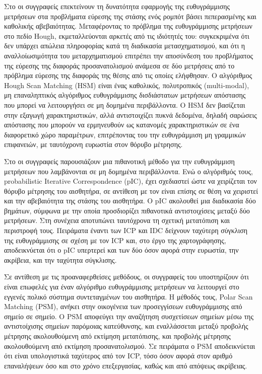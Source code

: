 Στο \cite{Censia} οι συγγραφείς επεκτείνουν τη δυνατότητα εφαρμογής της
ευθυγράμμισης μετρήσεων στα προβλήματα εύρεσης της στάσης ενός ρομπότ βάσει
πεπερασμένης και καθολικής αβεβαιότητας. Μεταφέροντας το πρόβλημα της
ευθυγράμμισης μετρήσεων στο πεδίο Hough, εκμεταλλεύονται αρκετές από τις
ιδιότητές του: συγκεκριμένα ότι δεν υπάρχει απώλεια πληροφορίας κατά τη
διαδικασία μετασχηματισμού, και ότι η αναλλοίωσιμότητα του μεταρχηματισμού
επιτρέπει την αποσύνδεση του προβλήματος της εύρεσης της διαφοράς
προσανατολισμού ανάμεσα σε δύο μετρήσεις από το πρόβλημα εύρεσης της διαφοράς
της θέσης από τις οποίες ελήφθησαν. Ο αλγόριθμος Hough Scan Matching (HSM)
είναι ένας καθολικός, πολυτροπικός (multi-modal), μη επαναληπτικός αλγόριθμος
ευθυγράμμισης δισδιάστατων μετρήσεων απόστασης που μπορεί να λειτουργήσει σε μη
δομημένα περιβάλλοντα. Ο HSM δεν βασίζεται στην εξαγωγή χαρακτηριστικών, αλλά
αντιστοιχίζει πυκνά δεδομένα, δηλαδή σαρώσεις απόστασης που μπορούν να
ερμηνευθούν ως κατανομές χαρακτηριστικών σε ένα διαφορετικό χώρο παραμέτρων,
επιτρέποντας του την ευθυγράμμιση μη γραμμικών επιφανειών, με ταυτόχρονη
ευρωστία στον θόρυβο μέτρησης.

Στο \cite{Montesano2005} οι συγγραφείς παρουσιάζουν μια πιθανοτική μέθοδο για
την ευθυγράμμιση μετρήσεων που λαμβάνονται σε μη δομημένα περιβάλλοντα. Ενώ ο
αλγόριθμός τους, probabilistic Iterative Correspondence (pIC), έχει σχεδιαστεί
ώστε να χειρίζεται τον θόρυβο μέτρησης του αισθητήρα, σε αντίθεση με τον
\cite{Pfistera} είναι επίσης σε θέση να χειριστεί και την αβεβαιότητα της
στάσης του αισθητήρα. O pIC ακολουθεί μια διαδικασία δύο βημάτων, σύμφωνα με
την οποία προσδιορίζει πιθανοτικά αντιστοιχίσεις μεταξύ δύο μετρήσεων. Στη
συνέχεια αποτυπώνει ταυτόχρονα τη σχετική μετατόπιση και περιστροφή τους.
Πειράματα έναντι των ICP και IDC δείχνουν ταχύτερη σύγκλιση της ευθυγράμμισης
σε σχέση με τον ICP και, στο έργο της χαρτογράφησης, αποδεικνύεται ότι ο pIC
υπερτερεί και των δύο όσον αφορά στην ευρωστία, την ακρίβεια, και την ταχύτητα
σύγκλισης.

Σε αντίθεση με τις προαναφερθείσες μεθόδους, οι συγγραφείς του \cite{Diosi2005}
υποστηρίζουν ότι είναι επωφελές για έναν αλγόριθμο ευθυγράμμισης μετρήσεων να
λειτουργεί στο εγγενές πολικό σύστημα συντεταγμένων του αισθητήρα. Η μέθοδός
τους, Polar Scan Matching (PSM), ανήκει στην οικογένεια των προσεγγίσεων
ευθυγράμμισης από σημείο σε σημείο. O PSM αποφεύγει την αναζήτηση συσχετίσεων
σημείων μέσω της αντιστοίχισης σημείων παρόμοιας κατεύθυνσης, και
εναλλάσσεται μεταξύ προβολής μέτρησης ακολουθούμενη από εκτίμηση μετατόπισης,
και προβολής μέτρησης ακολουθούμενη από εκτίμηση προσανατολισμού. Σε πειράματα
ο PSM αποδεικνύεται ότι είναι υπολογιστικά ταχύτερος από τον ICP, τόσο όσον
αφορά στον αριθμό επαναλήψεων όσο και στο χρόνο επεξεργασίας, καθώς και από
απόψεως ακρίβειας.

